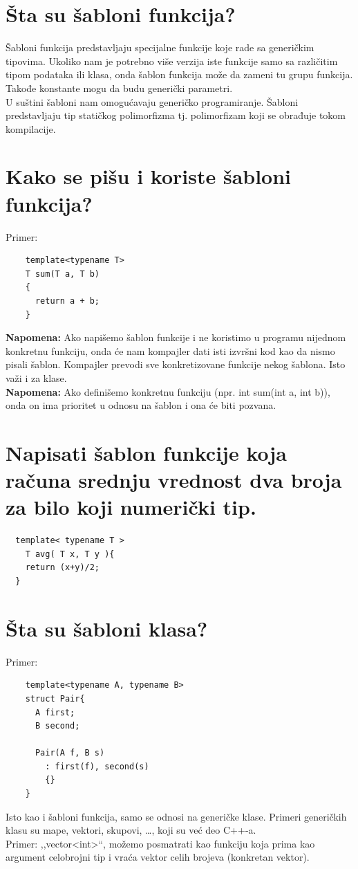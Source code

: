 \documentclass[a4paper]{article}
\begin{document}
\section{Šta su šabloni funkcija?}
    Šabloni funkcija predstavljaju specijalne funkcije koje rade sa generičkim tipovima. 
    Ukoliko nam je potrebno više verzija iste funkcije samo sa različitim tipom podataka ili klasa, 
    onda šablon funkcija može da zameni tu grupu funkcija. Takođe konstante mogu da budu generički 
    parametri. \\
    \indent U suštini šabloni nam omogućavaju generičko programiranje. Šabloni predstavljaju tip 
    statičkog polimorfizma tj. polimorfizam koji se obrađuje tokom kompilacije.\cite{cppref_templates}

\section{Kako se pišu i koriste šabloni funkcija?}
  \noindent Primer:
  \begin{lstlisting}
    template<typename T> 
    T sum(T a, T b)
    {
      return a + b;
    }\end{lstlisting}
  \textbf{Napomena:} Ako napišemo šablon funkcije i ne koristimo u programu nijednom konkretnu funkciju,
  onda će nam kompajler dati isti izvršni kod kao da nismo pisali šablon. Kompajler prevodi 
  sve konkretizovane funkcije nekog šablona. Isto važi i za klase. \\
  \textbf{Napomena:} Ako definišemo konkretnu funkciju (npr. int sum(int a, int b)), onda on ima 
  prioritet u odnosu na šablon i ona će biti pozvana.

\section{Napisati šablon funkcije koja računa srednju vrednost dva broja za bilo koji numerički tip.}
\begin{lstlisting}
  template< typename T >
    T avg( T x, T y ){
    return (x+y)/2;
  }\end{lstlisting}

\section{Šta su šabloni klasa?}
  \noindent Primer:
  \begin{lstlisting}
    template<typename A, typename B>
    struct Pair{
      A first;
      B second;
    
      Pair(A f, B s)
        : first(f), second(s)
        {}
    }\end{lstlisting}
  Isto kao i šabloni funkcija, samo se odnosi na generičke klase. Primeri generičkih klasu su mape, 
  vektori, skupovi, \dots, koji su već deo C++-a. \\
  \indent Primer: ,,vector<int>``, možemo posmatrati kao funkciju 
  koja prima kao argument celobrojni tip i vraća vektor celih brojeva (konkretan vektor).
\end{document}
